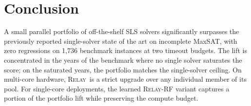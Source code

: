 \documentclass[11pt,letterpaper]{article}
\newcommand{\RELAY}{\textsc{Relay}}
\begin{document}
\section{Conclusion}

A small parallel portfolio of off-the-shelf SLS solvers significantly surpasses the previously reported single-solver state of the art on incomplete MaxSAT, with zero regressions on 1{,}736 benchmark instances at two timeout budgets.  The lift is concentrated in the years of the benchmark where no single solver saturates the score; on the saturated years, the portfolio matches the single-solver ceiling.  On multi-core hardware, \RELAY\ is a strict upgrade over any individual member of its pool.  For single-core deployments, the learned \RELAY-RF variant captures a portion of the portfolio lift while preserving the compute budget.
\end{document}
